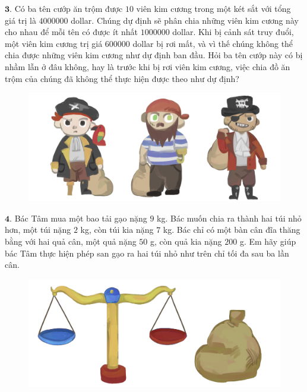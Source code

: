 \begin{multicols}{2}
\begin{figure}[H]
		\vspace*{-5pt}
	\end{figure}
	$\pmb{3.}$ Có ba tên cướp ăn trộm được $10$ viên kim cương trong một két sắt với tổng giá trị là $4 000 000$ dollar. Chúng dự định sẽ phân chia những viên kim cương này cho nhau để mỗi tên có được ít nhất $1 000 000$ dollar. Khi bị cảnh sát truy đuổi, một viên kim cương trị giá $600 000$ dollar bị rơi mất, và vì thế chúng không thể chia được những viên kim cương như dự định ban đầu. Hỏi ba tên cướp này có bị nhầm lẫn ở đâu không, hay là trước khi bị rơi viên kim cương, việc chia đồ ăn trộm của chúng đã không thể thực hiện được theo như dự định?
	\begin{figure}[H]
		\centering
		\vspace*{-5pt}
		\captionsetup{labelformat= empty, justification=centering}
		\includegraphics[width=1\linewidth]{Hinh3}
		\vspace*{-15pt}
	\end{figure}
	$\pmb{4.}$ 	Bác Tâm mua một bao tải gạo nặng $9$ kg. Bác muốn chia ra thành hai túi nhỏ hơn, một túi nặng $2$ kg, còn túi kia nặng $7$ kg. Bác chỉ có một bàn cân đĩa thăng bằng với hai quả cân, một quả nặng $50$ g, còn quả kia nặng $200$ g. Em hãy giúp bác Tâm thực hiện phép san gạo ra hai túi nhỏ như trên chỉ tối đa sau ba lần cân.
	\begin{figure}[H]
		\centering
		\captionsetup{labelformat= empty, justification=centering}
		\includegraphics[width=1\linewidth]{Hinh4}

\end{figure}
\end{multicols}
